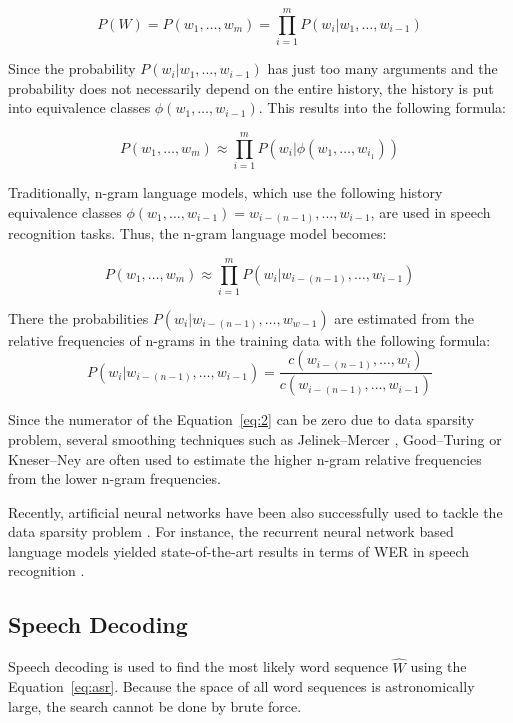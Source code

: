\begin{equation}
  P(W) = P(w_1,\dots,w_m) = \prod\limits_{i=1}^{m} P(w_i|w_1,\dots,w_{i-1})
\end{equation}

Since the probability $P(w_i|w_1,\dots,w_{i-1})$ has just too many arguments
  and the probability does not necessarily depend on the entire history,
  the history is put into equivalence classes $\phi(w_1,\dots,w_{i-1})$.
This results into the following formula:

\begin{equation}
  P(w_1,\dots,w_m) \approx \prod\limits_{i=1}^{m} P(w_i|\phi(w_1,\dots,w_{i_1}))
\end{equation}

Traditionally, n-gram language models,
  which use the following history equivalence classes $\phi(w_1,\dots,w_{i-1}) = w_{i-(n-1)},\dots,w_{i-1}$,
  are used in speech recognition tasks.
Thus, the n-gram language model becomes:

\begin{equation}
  P(w_1,\dots,w_m) \approx \prod\limits_{i=1}^{m} P(w_i|w_{i-(n-1)},\dots,w_{i-1})
\end{equation}

There the probabilities $P(w_i|w_{i-(n-1)},\dots,w_{w-1})$ are estimated from the relative frequencies of n-grams in the training data with the following formula:
\begin{equation}
  \label{eq:2}
  P(w_i|w_{i-(n-1)},\dots,w_{i-1}) = \frac{c(w_{i-(n-1)},\dots,w_i)}{c(w_{i-(n-1)},\dots,w_{i-1})}
\end{equation}


Since the numerator of the Equation~\ref{eq:2} can be zero due to data sparsity problem,
  several smoothing techniques such as
  Jelinek--Mercer \cite{jelinek1980interpolated},
  Good--Turing \cite{gale1995good}
  or Kneser--Ney \cite{kneser1995improved} are often used to estimate the higher n-gram relative frequencies from the lower n-gram frequencies.

Recently, artificial neural networks have been also successfully used to tackle the data sparsity problem \cite{bengio2003neural}.
For instance, the recurrent neural network based language models yielded state-of-the-art results in terms of WER in speech recognition \cite{mikolov2010recurrent}.


\subsection{Speech Decoding}
Speech decoding is used to find the most likely word sequence $\widehat{W}$ using the Equation~\ref{eq:asr}.
Because the space of all word sequences is astronomically large, the search cannot be done by brute force.

